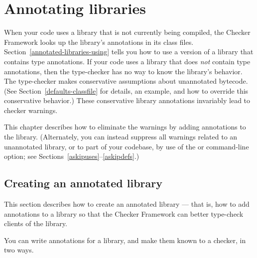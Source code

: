\htmlhr
\chapter{Annotating libraries\label{annotating-libraries}}

When your code uses a library that is not currently being compiled,
the Checker Framework looks up the library's annotations in its class files.
Section~\ref{annotated-libraries-using} tells you how to use a
version of a library that contains type annotations.
If your code uses a library that does \emph{not} contain type annotations,
then the type-checker has no way to know the library's behavior.
The type-checker
makes conservative assumptions about unannotated bytecode.
(See
Section~\ref{defaults-classfile} for details, an example, and how to
override this conservative behavior.)
These conservative library
annotations invariably lead to checker warnings.

This chapter describes how to eliminate
the warnings by adding annotations to the library.
(Alternately, you can instead
suppress all warnings related to an unannotated library, or to part of your
codebase, by use of the
 or  command-line option; see
Sections~\ref{askipuses}--\ref{askipdefs}.)


\section{Creating an annotated library\label{annotated-libraries-creating}}

This section describes how to create an annotated library --- that is, how
to add annotations to a library so that the Checker Framework can better
type-check clients of the library.

You can write annotations for a library, and make them known to a checker, in two ways.

